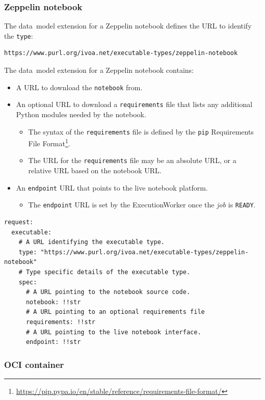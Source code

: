 \documentclass[11pt,a4paper]{ivoa}
\newcommand{\datamodel} {data~model}
\newcommand{\execworkerclass} {ExecutionWorker}
\newcommand{\python} {Python}
\newcommand{\zeppelin} {Zeppelin}
\newcommand{\codeword}[1] {\texttt{#1}}
\newcommand{\footurl}[1] {\footnote{\url{#1}}}
\newcommand{\job} {\textit{job}}
\begin{document}
\subsubsection{Zeppelin notebook}
\label{datamodel-zeppelin-notebook}

The \datamodel{} extension for a \zeppelin{} notebook defines the URL
to identify the \codeword{type}:
\begin{lstlisting}[]
https://www.purl.org/ivoa.net/executable-types/zeppelin-notebook
\end{lstlisting}
\hfill \break
The \datamodel{} extension for a \zeppelin{} notebook contains:
\begin{itemize}
    \item A URL to download the \codeword{notebook} from.
    \item An optional URL to download a \codeword{requirements} file that lists any additional
    \python{} modules needed by the notebook.
    \begin{itemize}
        \item The syntax of the \codeword{requirements} file is defined by the \codeword{pip}
        Requirements File Format\footurl{https://pip.pypa.io/en/stable/reference/requirements-file-format/}.
        \item The URL for the \codeword{requirements} file may be an absolute URL, or a relative URL based on the notebook URL.
    \end{itemize}
    \item An \codeword{endpoint} URL that points to the live notebook platform.
    \begin{itemize}
        \item The \codeword{endpoint} URL is set by the \execworkerclass{} once the \job{} is \codeword{READY}.
    \end{itemize}
\end{itemize}

\begin{lstlisting}[]
request:
  executable:
    # A URL identifying the executable type.
    type: "https://www.purl.org/ivoa.net/executable-types/zeppelin-notebook"
    # Type specific details of the executable type.
    spec:
      # A URL pointing to the notebook source code.
      notebook: !!str
      # A URL pointing to an optional requirements file
      requirements: !!str
      # A URL pointing to the live notebook interface.
      endpoint: !!str
\end{lstlisting}

\subsubsection{OCI container}
\label{datamodel-oci-container}
\end{document}
